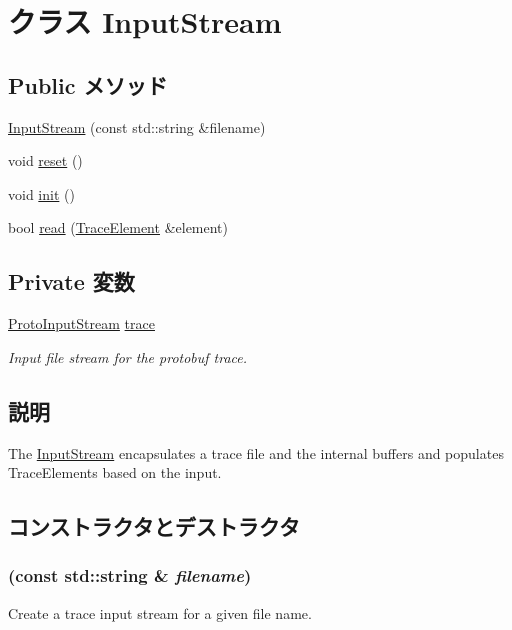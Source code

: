 \hypertarget{classTraceGen_1_1InputStream}{
\section{クラス InputStream}
\label{classTraceGen_1_1InputStream}
}
\subsection*{Public メソッド}
\begin{DoxyCompactItemize}
\item 
\hyperlink{classTraceGen_1_1InputStream_a579e53605c9d23917107c48e4c68d02d}{InputStream} (const std::string \&filename)
\item 
void \hyperlink{classTraceGen_1_1InputStream_ad20897c5c8bd47f5d4005989bead0e55}{reset} ()
\item 
void \hyperlink{classTraceGen_1_1InputStream_a02fd73d861ef2e4aabb38c0c9ff82947}{init} ()
\item 
bool \hyperlink{classTraceGen_1_1InputStream_ad46fc07f6483a6b8cd3b07223de00477}{read} (\hyperlink{structTraceGen_1_1TraceElement}{TraceElement} \&element)
\end{DoxyCompactItemize}
\subsection*{Private 変数}
\begin{DoxyCompactItemize}
\item 
\hyperlink{classProtoInputStream}{ProtoInputStream} \hyperlink{classTraceGen_1_1InputStream_aeea802262475e8c5d837e45e63ed5fa9}{trace}
\begin{DoxyCompactList}\small\item\em Input file stream for the protobuf trace. \item\end{DoxyCompactList}\end{DoxyCompactItemize}


\subsection{説明}
The \hyperlink{classTraceGen_1_1InputStream}{InputStream} encapsulates a trace file and the internal buffers and populates TraceElements based on the input. 

\subsection{コンストラクタとデストラクタ}
\hypertarget{classTraceGen_1_1InputStream_a579e53605c9d23917107c48e4c68d02d}{
\subsubsection[{InputStream}]{ (const std::string \& {\em filename})}}
\label{classTraceGen_1_1InputStream_a579e53605c9d23917107c48e4c68d02d}
Create a trace input stream for a given file name.



